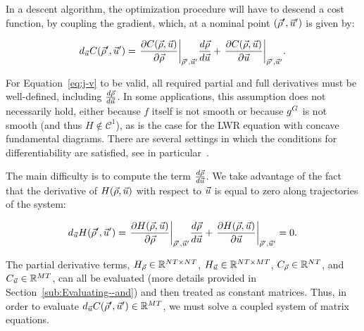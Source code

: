 In a descent algorithm, the optimization procedure will have to descend
a cost function, by coupling the gradient, which, at a nominal point
$\left(\nominal{\state},\nominal{\control}\right)$ is given by:

\begin{equation}
d_{\control}\cost\left(\nominal{\state},\nominal{\control}\right)=\evaluate{\pfrac{\cost\text{\ensuremath{\left(\state,\control\right)}}}{\state}}{\nominal{\state},\nominal{\control}}\Dfrac{\state}{\control}+\evaluate{\pfrac{\cost\text{\ensuremath{\left(\state,\control\right)}}}{\control}}{\nominal{\state},\nominal{\control}}\label{eq:j-v}.
\end{equation}

\begin{note}
For Equation~\eqref{eq:j-v} to be valid, all required partial and full derivatives must be well-defined, including $\frac{d\vec{\rho}}{d\vec{u}}$. In some applications, this assumption does not necessarily hold,
either because $f$ itself is not smooth or because $g^{G}$ is not
smooth (and thus $H \notin \mathcal{C}^1$), as is the case for the LWR equation with concave fundamental diagrams. There are several settings in which the
conditions for differentiability are satisfied, see in particular~\cite{Gugat2005,Flasskamp2012}.
\end{note}

The main difficulty is to compute the term $\frac{d\vec{\rho}}{d\vec{u}}$.
We take advantage of the fact that the derivative of $H\left(\state,\control\right)$
with respect to $\vec{u}$ is equal to zero along trajectories of
the system:

\begin{equation}
d_{\control}\sys\left(\nominal{\state},\nominal{\control}\right)=\evaluate{\pfrac{\sys\text{\ensuremath{\left(\state,\control\right)}}}{\state}}{\nominal{\state},\nominal{\control}}\Dfrac{\state}{\control}+\evaluate{\pfrac{\sys\text{\ensuremath{\left(\state,\control\right)}}}{\control}}{\nominal{\state},\nominal{\control}}=0\label{eq:h-v}.
\end{equation}


The partial derivative terms, $H_{\vec{\rho}}\in\mathbb{R}^{NT\times NT}$,
$H_{\vec{u}}\in\mathbb{R}^{NT\times MT}$, $C_{\vec{\rho}}\in\mathbb{R}^{NT}$,
and $C_{\vec{u}}\in\mathbb{R}^{MT}$, can all be evaluated (more
details provided in Section~\ref{sub:Evaluating--and}) and then
treated as constant matrices. Thus, in order to evaluate $d_{\control}\cost\left(\nominal{\state},\nominal{\control}\right)\in\mathbb{R}^{\ncontrols\ntime}$,
we must solve a coupled system of matrix equations.

